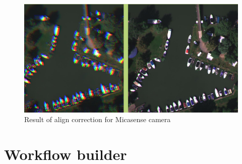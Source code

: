 \documentclass[a4paper,12pt]{article}
\begin{document}
	\begin{figure}
	\centering
	\includegraphics[width=14cm]{aligning.png}
	\caption{Result of align correction for Micasense camera}
	\label{fig:aligning}
	\end{figure}


\section{Workflow builder}
\end{document}
